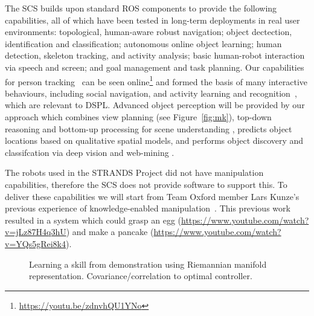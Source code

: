 \documentclass[runningheads,a4paper]{llncs}
\newcommand{\teamori}{Team Oxford}
\begin{document}
The SCS builds upon standard ROS components to provide the following capabilities, all of which have been tested in long-term deployments in real user environments: topological, human-aware robust navigation; object dectection, identification and classification; autonomous online object learning; human detection, skeleton tracking, and activity analysis; basic human-robot interaction via speech and screen; and goal management and task planning. Our capabilities for person tracking~\cite{dondrup2015tracker} can be seen online\footnote{\url{https://youtu.be/zdnvhQU1YNo}} and formed the basis of many interactive behaviours, including social navigation, and activity learning and recognition~\cite{duckworth_aamas2016}, which are relevant to DSPL. Advanced object perception will be provided by our approach which combines view planning (see Figure~\ref{fig:mk}), top-down reasoning and bottom-up processing for scene understanding \cite{kunze14topdown}, predicts object locations based on qualitative spatial models\cite{kunze14bootstrapping}, and performs object discovery and classifcation via deep vision and web-mining \cite{aloof@icra17}.

The robots used in the STRANDS Project did not have manipulation capabilities, therefore the SCS does not provide software to support this. To deliver these capabilities we will start from \teamori{} member Lars Kunze's previous experience of knowledge-enabled manipulation~\cite{kunze15aij}. This previous work resulted in a system which could grasp an egg (\url{https://www.youtube.com/watch?v=jLz87H4q3hU}) and make a pancake (\url{https://www.youtube.com/watch?v=YQs5gRei8k4}).



\begin{figure}[!ht]
	\centering
	\caption{Learning a skill from demonstration using Riemannian manifold representation. Covariance/correlation to optimal controller.}
	\label{fig:baxter_water_task}
\end{figure}
\end{document}
